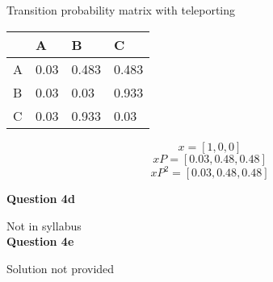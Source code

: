 \documentclass[11pt,a4paper]{report}
\begin{document}
\begin{multicols*}{2}
\noindent Transition probability matrix with teleporting
\begin{center}
\begin{tabular}{ |l|l|l|l| }
    \hline
      & A    & B    & C      \\
    \hline
    A & 0.03  & 0.483 & 0.483  \\
    B & 0.03  & 0.03  & 0.933 \\
    C & 0.03  & 0.933 & 0.03  \\
    \hline
\end{tabular}
\end{center}

$$x = [1,0,0]$$
$$xP = [0.03, 0.48, 0.48]$$
$$xP^2 = [0.03, 0.48, 0.48]$$

\noindent \textbf{Question 4d}

\noindent Not in syllabus\\

\noindent \textbf{Question 4e}

\noindent Solution not provided

\end{multicols*}
\end{document}
